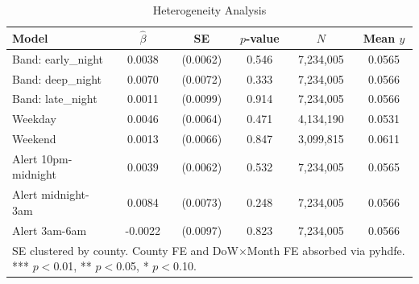 \begin{table}[htbp]\centering
\caption{Heterogeneity Analysis}
\begin{tabular}{lccccc}
\hline\hline
Model & $\hat\beta$ & SE & $p$-value & $N$ & Mean $y$ \\
\midrule
Band: early_night & 0.0038 & (0.0062) & 0.546 & 7,234,005 & 0.0565 \\
Band: deep_night & 0.0070 & (0.0072) & 0.333 & 7,234,005 & 0.0566 \\
Band: late_night & 0.0011 & (0.0099) & 0.914 & 7,234,005 & 0.0566 \\
Weekday & 0.0046 & (0.0064) & 0.471 & 4,134,190 & 0.0531 \\
Weekend & 0.0013 & (0.0066) & 0.847 & 3,099,815 & 0.0611 \\
Alert 10pm-midnight & 0.0039 & (0.0062) & 0.532 & 7,234,005 & 0.0565 \\
Alert midnight-3am & 0.0084 & (0.0073) & 0.248 & 7,234,005 & 0.0566 \\
Alert 3am-6am & -0.0022 & (0.0097) & 0.823 & 7,234,005 & 0.0566 \\
\hline\hline
\multicolumn{6}{p{0.9\textwidth}}{\footnotesize SE clustered by county. County FE and DoW$\times$Month FE absorbed via pyhdfe. *** $p{<}$0.01, ** $p{<}$0.05, * $p{<}$0.10.} \\
\end{tabular}
\end{table}